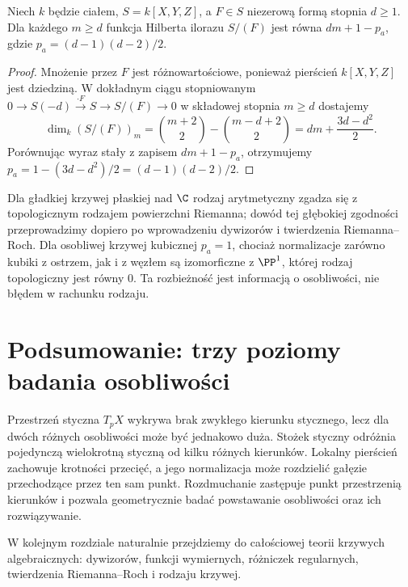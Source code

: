 \begin{twierdzenie}
\label{tw:arithmetic-genus-plane}
Niech $k$ będzie ciałem, $S=k[X,Y,Z]$, a $F\in S$
niezerową formą stopnia $d\ge1$. Dla każdego $m\ge d$
funkcja Hilberta ilorazu $S/(F)$ jest równa $dm+1-p_a$,
gdzie $p_a=(d-1)(d-2)/2$.
\end{twierdzenie}
\begin{proof}
Mnożenie przez $F$ jest różnowartościowe,
ponieważ pierścień $k[X,Y,Z]$ jest dziedziną.
W dokładnym ciągu stopniowanym
$0\to S(-d)\xrightarrow{\cdot F}S\to S/(F)\to0$
w składowej stopnia $m\ge d$ dostajemy
\[
 \dim_k(S/(F))_m=\binom{m+2}{2}-\binom{m-d+2}{2}
 =dm+\frac{3d-d^2}{2}.
\]
Porównując wyraz stały z zapisem $dm+1-p_a$,
otrzymujemy $p_a=1-(3d-d^2)/2=(d-1)(d-2)/2$.
\end{proof}

\begin{uwaga}
Dla gładkiej krzywej płaskiej nad $\C$ rodzaj
arytmetyczny zgadza się z topologicznym rodzajem
powierzchni Riemanna; dowód tej głębokiej zgodności
przeprowadzimy dopiero po wprowadzeniu dywizorów
i twierdzenia Riemanna--Roch. Dla osobliwej krzywej
kubicznej $p_a=1$, chociaż normalizacje zarówno
kubiki z ostrzem, jak i z węzłem są izomorficzne
z $\PP^1$, której rodzaj topologiczny jest równy $0$.
Ta rozbieżność jest informacją o osobliwości, nie błędem
w rachunku rodzaju.
\end{uwaga}

\section{Podsumowanie: trzy poziomy badania osobliwości}

Przestrzeń styczna $T_pX$ wykrywa brak zwykłego kierunku
stycznego, lecz dla dwóch różnych osobliwości może być
jednakowo duża. Stożek styczny odróżnia pojedynczą
wielokrotną styczną od kilku różnych kierunków.
Lokalny pierścień zachowuje krotności przecięć, a jego
normalizacja może rozdzielić gałęzie przechodzące przez
ten sam punkt. Rozdmuchanie zastępuje punkt przestrzenią
kierunków i pozwala geometrycznie badać powstawanie
osobliwości oraz ich rozwiązywanie.

W kolejnym rozdziale naturalnie przejdziemy do
całościowej teorii krzywych algebraicznych:
dywizorów, funkcji wymiernych, różniczek regularnych,
twierdzenia Riemanna--Roch i rodzaju krzywej.


